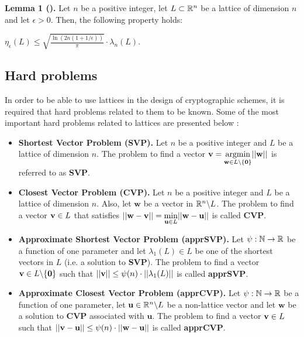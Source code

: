 \textbf{Lemma 1 (\cite{MiR04}).} Let $n$ be a positive integer, let $L \subset \mathbb{R}^n$ be a lattice of dimension $n$ and let $\epsilon > 0$. Then, the following property holds:
\begin{center}
	$\eta_\epsilon(L) \leq \sqrt{\frac{\ln(2n(1 + 1/\epsilon))}{\pi}} \cdot \lambda_n(L)$.
\end{center}

\subsection{Hard problems}

In order to be able to use lattices in the design of cryptographic schemes, it is required that hard problems related to them to be known. Some of the most important hard problems related to lattices are presented below \cite{HPS08}:

\begin{itemize}
	\item  \textbf{Shortest Vector Problem (SVP).} Let $n$ be a positive integer and $L$ be a lattice of dimension $n$. The problem to find a vector $\textbf{v} = \displaystyle{\operatorname*{argmin}_{ \textbf{w} \in L \backslash \{\textbf{0}\}}} ||\textbf{w}||$ is referred to as \textbf{SVP}.\\
	
	\item \textbf{Closest Vector Problem (CVP).} Let $n$ be a positive integer and $L$ be a lattice of dimension $n$. Also, let $\textbf{w}$ be a vector in $\mathbb{R}^n \backslash L$. The problem to find a vector $\textbf{v}\in L$ that satisfies $||\textbf{w} - \textbf{v}|| = \displaystyle{\min_{ \textbf{u} \in L}} ||\textbf{w} - \textbf{u} || $ is called \textbf{CVP}.\\
	
	\item \textbf{Approximate Shortest Vector Problem (apprSVP).} Let $\psi : {\mathbb N} \rightarrow \mathbb{R}$ be a function of one parameter and let $\lambda_1(L) \in L$ be one of the shortest vectors in $L$ (i.e. a solution to \textbf{SVP}). The problem to find a vector $\textbf{v} \in L \backslash \{\textbf{0}\}$ such that $||\textbf{v}|| \leq \psi(n) \cdot || \lambda_1(L) ||$ is called \textbf{apprSVP}.\\

	\item \textbf{Approximate Closest Vector Problem (apprCVP).} Let $\psi : {\mathbb N} \rightarrow \mathbb{R}$ be a function of one parameter, let $\textbf{u} \in \mathbb{R}^n \backslash L$ be a non-lattice vector and let $\textbf{w}$ be a solution to \textbf{CVP} associated with $\textbf{u}$. The problem to find a vector $\textbf{v} \in L$ such that $||\textbf{v} - \textbf{u} || \leq \psi(n) \cdot ||\textbf{w} - \textbf{u}||$ is called \textbf{apprCVP}.
\end{itemize}

